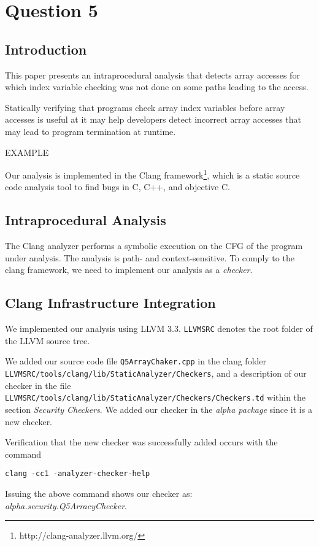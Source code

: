 \section*{Question 5}

\subsection*{Introduction}
This paper presents an intraprocedural analysis that detects
array accesses for which index variable checking was not done
on some paths leading to the access.

Statically verifying that programs check array index variables
before array accesses is useful at it may help developers detect
incorrect array accesses that may lead to program termination
at runtime.

EXAMPLE

Our analysis is implemented in the
Clang framework\footnote{http://clang-analyzer.llvm.org/},
which is a static source code analysis tool to find bugs in
C, C++, and objective C.

\subsection*{Intraprocedural Analysis}
%
%

The Clang analyzer performs a symbolic execution on the CFG
of the program under analysis. The analysis is path- and
context-sensitive. To comply to the clang framework, we need
to implement our analysis as a \textit{checker}. 

\subsection*{Clang Infrastructure Integration}

We implemented our analysis using LLVM 3.3.
\texttt{LLVMSRC} denotes the root folder of the LLVM source tree.

We added our source code file \texttt{Q5ArrayChaker.cpp} in the
clang folder \texttt{LLVMSRC/tools/clang/lib/StaticAnalyzer/Checkers},
and a description of our checker in the file
\texttt{LLVMSRC/tools/clang/lib/StaticAnalyzer/Checkers/Checkers.td}
within the section \textit{Security Checkers}. 
We added our checker in the \textit{alpha package} since it is a new checker.

Verification that the new checker was successfully added occurs with the
command
\begin{verbatim}
clang -cc1 -analyzer-checker-help
\end{verbatim}

Issuing the above command shows our checker as: \textit{alpha.security.Q5ArracyChecker}.






